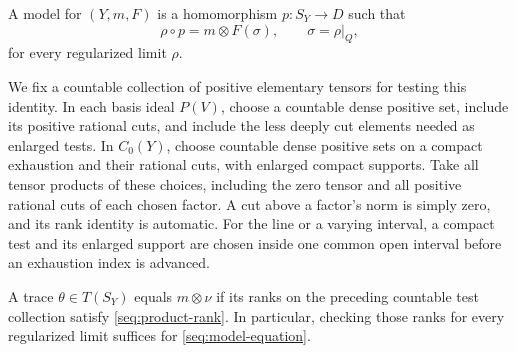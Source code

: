 \begin{definition}[Model]\label{seq:model}
A model for \((Y,m,F)\) is a homomorphism \(p:S_Y\to D\) such that
\begin{equation}\label{seq:model-equation}
 \rho\circ p=m\otimes F(\sigma),\qquad \sigma=\rho|_Q,
\end{equation}
for every regularized limit \(\rho\).
\end{definition}

We fix a countable collection of positive elementary tensors for
testing this identity. In each basis ideal \(P(V)\), choose a
countable dense positive set, include its positive rational cuts,
and include the less deeply cut elements needed as enlarged tests.
In \(C_0(Y)\), choose countable dense positive sets on a compact
exhaustion and their rational cuts, with enlarged compact supports.
Take all tensor products of these choices, including the zero tensor
and all positive rational cuts of each chosen factor. A cut above a
factor's norm is simply zero, and its rank identity is automatic.
For the line or a varying interval, a compact test and its enlarged support are chosen inside
one common open interval before an exhaustion index is advanced.

\begin{lemma}\label{seq:elementary-tests}
A trace \(\theta\in T(S_Y)\) equals \(m\otimes\nu\) if its
ranks on the preceding countable test collection satisfy
\eqref{seq:product-rank}. In particular, checking those ranks for
every regularized limit suffices for \eqref{seq:model-equation}.
\end{lemma}

